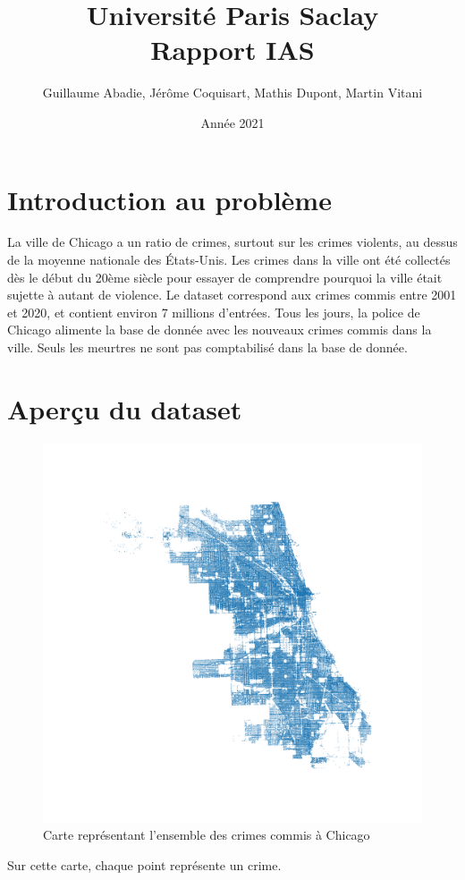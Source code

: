 \documentclass{article}
\title{\textbf{\Huge  Université Paris Saclay}\\ Rapport IAS}
\author{Guillaume Abadie, Jérôme Coquisart, Mathis Dupont, Martin Vitani}
\date{Année 2021}
\begin{document}
    \maketitle
    \tableofcontents

    \section{Introduction au problème}
    La ville de Chicago a un ratio de crimes, surtout sur les crimes violents, au dessus de la moyenne
    nationale des États-Unis.
    Les crimes dans la ville ont été collectés dès le début du 20ème siècle pour essayer de 
    comprendre pourquoi la ville était sujette à autant de violence.
    Le dataset correspond aux crimes commis entre 2001 et 2020, et contient environ 
    7 millions d'entrées.
    Tous les jours, la police de Chicago alimente la base de donnée avec les nouveaux crimes commis
    dans la ville. Seuls les meurtres ne sont pas comptabilisé dans la base de donnée.

    \section{Aperçu du dataset}
    \begin{figure}[H]
            \centering
	    \includegraphics[scale=.2]{carte_chicago.png}
	    \caption{Carte représentant l'ensemble des crimes commis à Chicago}
    \end{figure}
    Sur cette carte, chaque point représente un crime.
\end{document}

